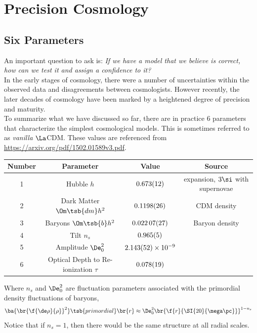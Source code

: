 \documentclass{article}
\begin{document}
\section{Precision Cosmology}

\subsection{Six Parameters}
An important question to ask is: \textit{If we have a model that we believe is correct, how can we test it and assign a confidence to it?}\\

In the early stages of cosmology, there were a number of uncertainties within the observed data and disagreements between cosmologists. However recently, the later decades of cosmology have been marked by a heightened degree of precision and maturity. \\

To summarize what we have discussed so far, there are in practice $6$ parameters that characterize the simplest cosmological models. This is sometimes referred to as \textit{vanilla} $\La$CDM. These values are referenced from \url{https://arxiv.org/pdf/1502.01589v3.pdf}.
\begin{center}
\begin{tabular}{|c|c|c|c|}
    \hline
    Number & Parameter & Value & Source \\
    \hline
    1 & Hubble $h$ & $\SI{0.673\pm0.012}{}$ & expansion, $3\si$ with supernovae \\
    2 & Dark Matter $\Om\tsb{dm}h^2$ & $\SI{0.1198\pm0.0026}{}$ & CDM density \\
    3 & Baryons $\Om\tsb{b}h^2$ & $\SI{0.02207\pm0.00027}{}$ & Baryon density \\
    4 & Tilt $n_s$ & $\SI{0.965\pm0.005}{}$ &  \\
    5 & Amplitude $\De_0^2$ & ${\SI{2.143\pm0.052}{}} \times \SI{e-9}{}$ &  \\
    6 & Optical Depth to Re-ionization $\tau$ & ${\SI{0.078\pm0.019}{}}$ &  \\
    \hline
\end{tabular}
\end{center}

Where $n_s$ and $\De_0^2$ are fluctuation parameters associated with the primordial density fluctuations of baryons,
\[ \ba{\br{\f{\de \rho}{\rho}}^2}\tsb{primordial}\br{r} \approx \De_0^2 \br{\f{r}{\SI{20}{\mega\pc}}}^{1-n_s} \]
Notice that if $n_s = 1$, then there would be the same structure at all radial scales. \\
\end{document}
